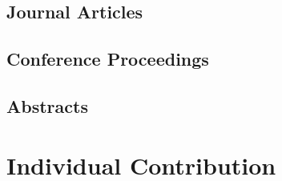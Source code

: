 \section{Journal Articles}

\section{Conference Proceedings}

\section{Abstracts}

\chapter{Individual Contribution}\label{apn:individual_contribution}
